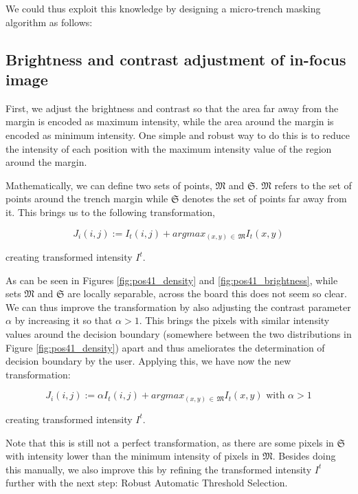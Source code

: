 \documentclass[pdftex,12pt,a4paper]{report}
\begin{document}
We could thus exploit this knowledge by designing a micro-trench masking algorithm as follows:

\subsection{Brightness and contrast adjustment of in-focus image}
\label{subsubsection:brightness_contrast_adjustment}

First, we adjust the brightness and contrast so that the area far away from the margin is encoded as maximum intensity, while the area around the margin is encoded as minimum intensity. One simple and robust way to do this is to reduce the intensity of each position with the maximum intensity value of the region around the margin.

Mathematically, we can define two sets of points, $\mathfrak{M}$ and $\mathfrak{S}$. $\mathfrak{M}$ refers to the set of points around the trench margin while $\mathfrak{S}$ denotes the set of points far away from it. This brings us to the following transformation,

$$
J_i(i, j) := I_t(i, j) + argmax_{(x, y) \, \in \, \mathfrak{M}}{I_t(x, y)}
$$

creating transformed intensity $I^t$.

As can be seen in Figures \ref{fig:pos41_density} and \ref {fig:pos41_brightness}, while sets $\mathfrak{M}$ and $\mathfrak{S}$ are locally separable, across the board this does not seem so clear. We can thus improve the transformation by also adjusting the contrast parameter $\alpha$ by increasing it so that $\alpha > 1$. This brings the pixels with similar intensity values around the decision boundary (somewhere between the two distributions in Figure \ref{fig:pos41_density}) apart and thus ameliorates the determination of decision boundary by the user. Applying this, we have now the new transformation:

$$
J_i(i, j) := \alpha I_t(i, j) + argmax_{(x, y) \, \in \, \mathfrak{M}}{I_t(x, y)} \text{ with } \alpha > 1
$$

creating transformed intensity $I^t$.

Note that this is still not a perfect transformation, as there are some pixels in $\mathfrak{S}$ with intensity lower than the minimum intensity of pixels in $\mathfrak{M}$. Besides doing this manually, we also improve this by refining the transformed intensity $I^t$ further with the next step: Robust Automatic Threshold Selection.
\end{document}
